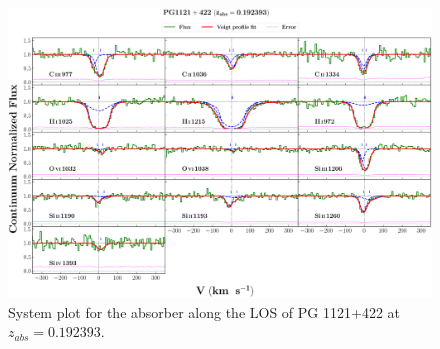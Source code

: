   
  
  \newpage
  \thispagestyle{empty}

  \begin{landscape}
  
  \begin{figure}
      \centering
      \vspace{-10mm}
      \hspace*{-20mm}
      \includegraphics[width=1.1\linewidth]{System-Plots/PG1121+422_z=0.192393_sys_plot.png}
      \caption{System plot for the absorber along the LOS of PG 1121+422 at $z_{abs} = 0.192393$. }
  \end{figure}
  
  \end{landscape}
  
